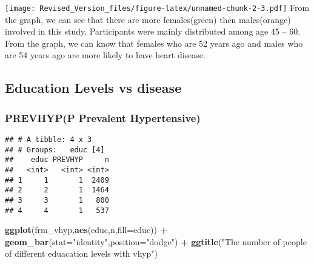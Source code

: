 \documentclass[]{article}
\newenvironment{Shaded}{\begin{snugshade}}{\end{snugshade}}
\newcommand{\KeywordTok}[1]{\textcolor[rgb]{0.13,0.29,0.53}{\textbf{#1}}}
\newcommand{\DataTypeTok}[1]{\textcolor[rgb]{0.13,0.29,0.53}{#1}}
\newcommand{\DecValTok}[1]{\textcolor[rgb]{0.00,0.00,0.81}{#1}}
\newcommand{\StringTok}[1]{\textcolor[rgb]{0.31,0.60,0.02}{#1}}
\newcommand{\OperatorTok}[1]{\textcolor[rgb]{0.81,0.36,0.00}{\textbf{#1}}}
\newcommand{\NormalTok}[1]{#1}
\begin{document}
\texttt{[image: Revised\_Version\_files/figure-latex/unnamed-chunk-2-3.pdf]}
From the graph, we can see that there are more females(green) then
males(orange) involved in this study. Participants were mainly
distributed among age 45 -- 60. From the graph, we can know that females
who are 52 years ago and males who are 54 years ago are more likely to
have heart disease.

\subsection{Education Levels vs
disease}\label{education-levels-vs-disease}

\subsubsection{PREVHYP(P Prevalent
Hypertensive)}\label{prevhypp-prevalent-hypertensive}

\begin{Shaded}
\end{Shaded}

\begin{verbatim}
## # A tibble: 4 x 3
## # Groups:   educ [4]
##    educ PREVHYP     n
##   <int>   <int> <int>
## 1     1       1  2409
## 2     2       1  1464
## 3     3       1   800
## 4     4       1   537
\end{verbatim}

\begin{Shaded}
\begin{Highlighting}[]
\KeywordTok{ggplot}\NormalTok{(frm_vhyp,}\KeywordTok{aes}\NormalTok{(educ,n,}\DataTypeTok{fill=}\NormalTok{educ)) }\OperatorTok{+}
\StringTok{  }\KeywordTok{geom_bar}\NormalTok{(}\DataTypeTok{stat=}\StringTok{"identity"}\NormalTok{,}\DataTypeTok{position=}\StringTok{"dodge"}\NormalTok{) }\OperatorTok{+}
\StringTok{  }\KeywordTok{ggtitle}\NormalTok{(}\StringTok{"The number of people of different eduacation levels with vhyp"}\NormalTok{)}
\end{Highlighting}
\end{Shaded}
\end{document}
